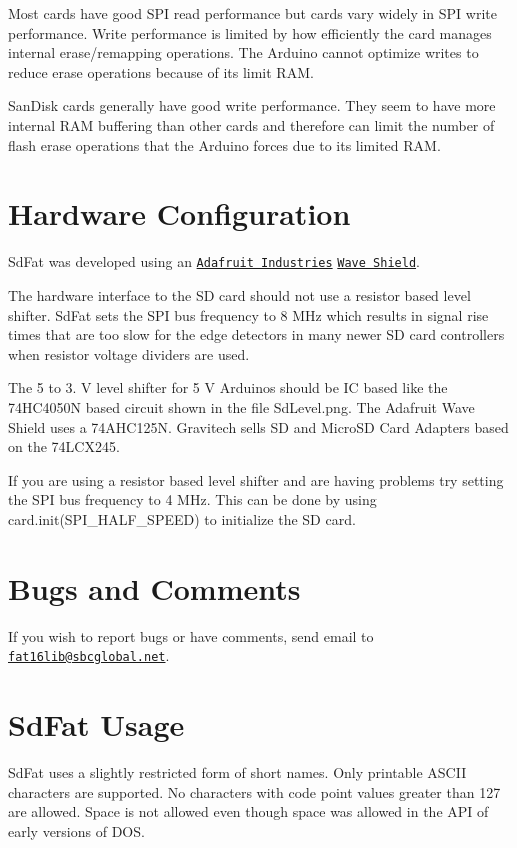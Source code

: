 Most cards have good S\+PI read performance but cards vary widely in S\+PI write performance. Write performance is limited by how efficiently the card manages internal erase/remapping operations. The Arduino cannot optimize writes to reduce erase operations because of its limit R\+AM.

San\+Disk cards generally have good write performance. They seem to have more internal R\+AM buffering than other cards and therefore can limit the number of flash erase operations that the Arduino forces due to its limited R\+AM.\hypertarget{index_Hardware}{}\section{Hardware Configuration}\label{index_Hardware}
Sd\+Fat was developed using an \href{http://www.adafruit.com/}{\tt Adafruit Industries} \href{http://www.ladyada.net/make/waveshield/}{\tt Wave Shield}.

The hardware interface to the SD card should not use a resistor based level shifter. Sd\+Fat sets the S\+PI bus frequency to 8 M\+Hz which results in signal rise times that are too slow for the edge detectors in many newer SD card controllers when resistor voltage dividers are used.

The 5 to 3. V level shifter for 5 V Arduinos should be IC based like the 74\+H\+C4050N based circuit shown in the file Sd\+Level.\+png. The Adafruit Wave Shield uses a 74\+A\+H\+C125N. Gravitech sells SD and Micro\+SD Card Adapters based on the 74\+L\+C\+X245.

If you are using a resistor based level shifter and are having problems try setting the S\+PI bus frequency to 4 M\+Hz. This can be done by using card.\+init(\+S\+P\+I\+\_\+\+H\+A\+L\+F\+\_\+\+S\+P\+E\+E\+D) to initialize the SD card.\hypertarget{index_comment}{}\section{Bugs and Comments}\label{index_comment}
If you wish to report bugs or have comments, send email to \href{mailto:fat16lib@sbcglobal.net}{\tt fat16lib@sbcglobal.\+net}.\hypertarget{index_SdFatClass}{}\section{Sd\+Fat Usage}\label{index_SdFatClass}
Sd\+Fat uses a slightly restricted form of short names. Only printable A\+S\+C\+II characters are supported. No characters with code point values greater than 127 are allowed. Space is not allowed even though space was allowed in the A\+PI of early versions of D\+OS.

